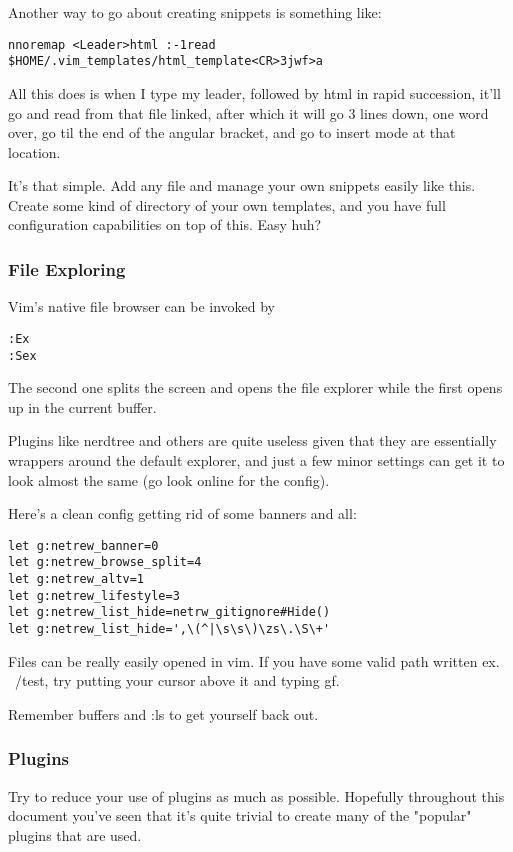 \documentclass[12pt, letterpaper]{article}
\begin{document}
Another way to go about creating snippets is something like:
\begin{verbatim}
nnoremap <Leader>html :-1read $HOME/.vim_templates/html_template<CR>3jwf>a
\end{verbatim}
All this does is when I type my leader, followed by html in rapid succession,
it'll go and read from that file linked, after which it will go 3 lines down,
one word over, go til the end of the angular bracket, and go to insert mode at
that location.

It's that simple. Add any file and manage your own snippets easily like this.
Create some kind of directory of your own templates, and you have full
configuration capabilities on top of this. Easy huh?

\subsubsection{File Exploring}
Vim's native file browser can be invoked by
\begin{verbatim}
:Ex
:Sex
\end{verbatim}

The second one splits the screen and opens the file explorer while the first
opens up in the current buffer.

Plugins like nerdtree and others are quite useless given that they are
essentially wrappers around the default explorer, and just a few minor settings
can get it to look almost the same (go look online for the config).

Here's a clean config getting rid of some banners and all:
\begin{verbatim}
let g:netrew_banner=0
let g:netrew_browse_split=4
let g:netrew_altv=1
let g:netrew_lifestyle=3
let g:netrew_list_hide=netrw_gitignore#Hide()
let g:netrew_list_hide=',\(^|\s\s\)\zs\.\S\+'
\end{verbatim}

Files can be really easily opened in vim.
If you have some valid path written ex. ~/test, try putting your cursor above
it and typing gf.

Remember buffers and :ls to get yourself back out.

\subsubsection{Plugins}
Try to reduce your use of plugins as much as possible. Hopefully throughout
this document you've seen that it's quite trivial to create many of the
"popular" plugins that are used. 
\end{document}
